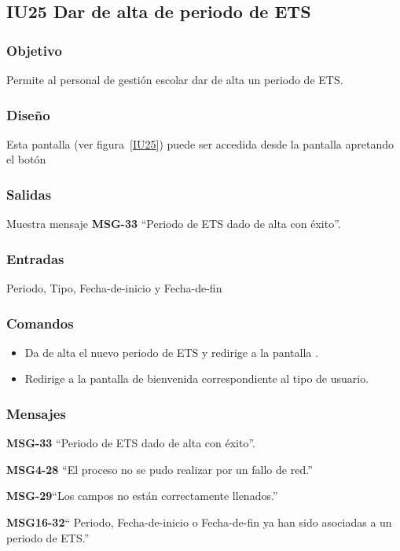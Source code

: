 
\subsection{IU25 Dar de alta de periodo de ETS}
\subsubsection{Objetivo}
    Permite al personal de gestión escolar dar de alta un periodo de ETS.
\subsubsection{Diseño}
    Esta pantalla  (ver figura~\ref{IU25}) puede ser accedida desde la pantalla  apretando el botón 

\subsubsection{Salidas}
Muestra mensaje {\bf MSG-33} ``Periodo de ETS  dado de alta con éxito''.
\subsubsection{Entradas}
Periodo, Tipo, Fecha-de-inicio y Fecha-de-fin
\subsubsection{Comandos}
\begin{itemize}
    \item {} Da de alta el nuevo periodo de ETS y redirige a la pantalla .
    \item {} Redirige a la pantalla de bienvenida correspondiente al tipo de usuario.
    
\end{itemize}

\subsubsection{Mensajes}

\begin{Citemize}
    \item {\bf MSG-33} ``Periodo de ETS  dado de alta con éxito''.
    \item {\bf MSG4-28}  ``El proceso no se pudo realizar por un fallo de red.''
    \item {\bf MSG-29}{``Los campos no están correctamente llenados.''}
    \item {\bf MSG16-32}{`` Periodo, Fecha-de-inicio o Fecha-de-fin ya han sido asociadas a un periodo de ETS.''}
\end{Citemize}

